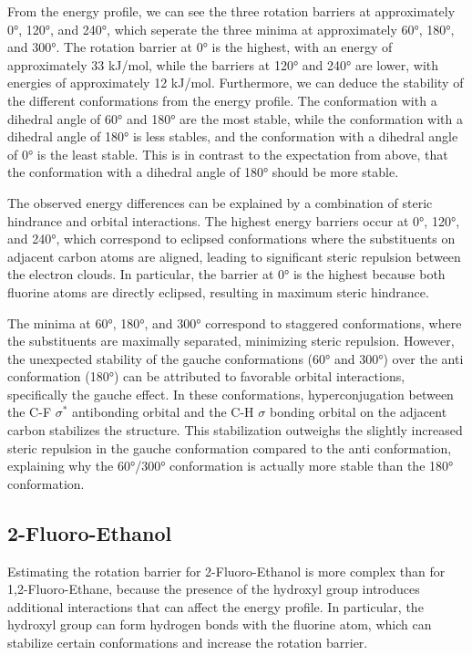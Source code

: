 \documentclass[a4paper,12pt]{scrartcl}
\begin{document}
From the energy profile, we can see the three rotation barriers at approximately 0°, 120°, and 240°, which seperate the three minima at approximately 60°, 180°, and 300°.
The rotation barrier at 0° is the highest, with an energy of approximately 33 kJ/mol, while the barriers at 120° and 240° are lower, with energies of approximately 12 kJ/mol.
Furthermore, we can deduce the stability of the different conformations from the energy profile. The conformation with a dihedral angle of 60° and 180° are the most stable, while the conformation with a dihedral angle of 180° is less stables, and the conformation with a dihedral angle of 0° is the least stable.
This is in contrast to the expectation from above, that the conformation with a dihedral angle of 180° should be more stable. 

The observed energy differences can be explained by a combination of steric hindrance and orbital interactions. The highest energy barriers occur at 0°, 120°, and 240°, which correspond to eclipsed conformations where the substituents on adjacent carbon atoms are aligned, leading to significant steric repulsion between the electron clouds. In particular, the barrier at 0° is the highest because both fluorine atoms are directly eclipsed, resulting in maximum steric hindrance.

The minima at 60°, 180°, and 300° correspond to staggered conformations, where the substituents are maximally separated, minimizing steric repulsion. However, the unexpected stability of the gauche conformations (60° and 300°) over the anti conformation (180°) can be attributed to favorable orbital interactions, specifically the gauche effect. In these conformations, hyperconjugation between the C-F $\sigma^*$ antibonding orbital and the C-H $\sigma$ bonding orbital on the adjacent carbon stabilizes the structure. This stabilization outweighs the slightly increased steric repulsion in the gauche conformation compared to the anti conformation, explaining why the 60°/300° conformation is actually more stable than the 180° conformation.

\subsection{2-Fluoro-Ethanol}

Estimating the rotation barrier for 2-Fluoro-Ethanol is more complex than for 1,2-Fluoro-Ethane, because the presence of the hydroxyl group introduces additional interactions that can affect the energy profile. In particular, the hydroxyl group can form hydrogen bonds with the fluorine atom, which can stabilize certain conformations and increase the rotation barrier.
\end{document}
